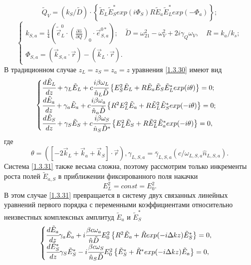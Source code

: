 \documentclass[a4paper]{article}
\begin{document}
	$$\tilde{Q}_{V}=(k_{S}/\tilde{D})\cdot\left\{\tilde{E}_{L}\tilde{E}_{S}^{*}exp(i\Phi_{S})R\tilde{E}_{a}\tilde{E}_{L}^{*}exp(-\Phi_{a})\right\};$$
\begin{equation}
	\begin{cases}
		k_{S,a}=\frac{1}{4}\left(\tilde{\vec{e}}_{L}^{0}\cdot\left(\frac{\partial\hat{\alpha}}{\partial Q}\right)_{0}\cdot\vec{e}_{S,a}^{0*}\right);\quad\tilde{D}=\omega_{21}^{2}-\omega_{V}^{2}+2i\gamma_{Q}\omega_{V},\quad R=k_{a}/k_{s};\\
		\Phi_{S,a}=\left(\vec{k}_{S,a}\cdot\vec{r}\right)-\left(\vec{k}_{L}\cdot\vec{r}\right).
	\end{cases}
	\label{1.3.30'}\tag{30'}
\end{equation}
В традиционном случае $z_{L}=z_{S}=z_{a}=z$ уравнения \eqref{1.3.30} имеют вид 
\begin{equation}
	\begin{cases}
		\cfrac{d\tilde{E}_{L}}{dz}+\gamma_{L}\tilde{E}_{L}+c\cfrac{i\beta\omega_{L}}{\hat{n}_{L}\tilde{D}}\left\{E_{S}^{2}\tilde{E}_{L}+R\tilde{E}_{a}\tilde{E}_{S}\tilde{E}_{L}^{*}exp(i\theta)\right\}=0;\\
		
		\cfrac{d\tilde{E}_{a}}{dz}+\gamma_{a}\tilde{E}_{a}+c\cfrac{i\beta\omega_{a}}{\hat{n}_{a}\tilde{D}}\left\{R^{2}E_{L}^{2}\tilde{E}_{a}+R\tilde{E}_{L}^{2}\tilde{E}_{S}^{*}exp(-i\theta)\right\}=0;\\
		
		\cfrac{d\tilde{E}_{S}}{dz}+\gamma_{S}\tilde{E}_{S}+c\cfrac{i\beta\omega_{S}}{\hat{n}_{S}\tilde{D}^{*}}\left\{E_{L}^{2}\tilde{E}_{S}+R\tilde{E}_{L}^{2}\tilde{E}_{a}^{*}exp(-i\theta)\right\}=0,		
	\end{cases}
	\label{1.3.31}
\end{equation}
где $$\theta=\left(\left[-2\vec{k}_{L}+\vec{k}_{a}+\vec{k}_{S}\right]\cdot\vec{r}\right),\gamma_{L,S,a}=\bar{\gamma}_{L,S,a}(c/\omega_{L,S,a}\hat{n}_{L,S,a}).$$
Система \eqref{1.3.31} также весьма сложна, поэтому рассмотрим только инкременты роста полей $\tilde{E}_{a,S}$ в приближении фиксированного поля накачки 
\begin{equation}
	E_{L}^{2}=const=E_{0}^{2}.
	\label{1.3.32}
\end{equation}
В этом случае \eqref{1.3.31} превращается в систему двух связанных линейных уравнений первого порядка с переменными коэффициентами относительно неизвестных комплексных амплитуд $\tilde{E}_{a}$ и  $\tilde{E}_{S}^{*}$
\begin{equation}
	\begin{cases}
		\cfrac{d\tilde{E}_{a}}{dz}\gamma_{a}\tilde{E}_{a}+i\cfrac{\beta c\omega_{a}}{\hat{n}\tilde{D}}E_{0}^{2}\left\{R^{2}\tilde{E}_{a}+\tilde{R}exp(-i\Delta kz)\tilde{E}_{S}^{*}\right\}=0,\\
		
		\cfrac{d\tilde{E}_{S}^{*}}{dz}\gamma_{S}\tilde{E}_{S}^{*}-i\cfrac{\beta c\omega_{S}}{\hat{n}_{S}\tilde{D}}E_{0}^{2}\left\{\tilde{E}_{S}^{*}+\tilde{R}^{*}exp(-i\Delta kz)\tilde{E}_{a}\right\}=0,
	\end{cases}\label{1.3.33}
\end{equation}
\end{document}
